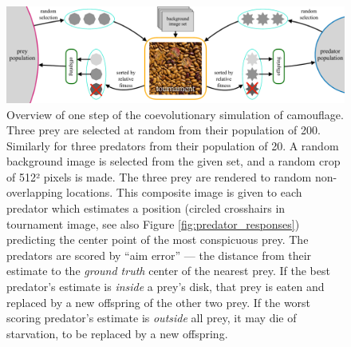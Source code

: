 \documentclass[acmtog]{acmart}
\newcommand{\jargon}[1]{\textit{#1}}
\begin{document}
\begin{figure}
    \includegraphics[width=\textwidth]{coc_overview.pdf}
    \caption{Overview of one step of the coevolutionary simulation of camouflage. Three prey are selected at random from their population of 200. Similarly for three predators from their population of 20. A random background image is selected from the given set, and a random crop of 512² pixels is made. The three prey are rendered to random non-overlapping locations. This composite image is given to each predator which estimates a position (circled crosshairs in tournament image, see also Figure \ref{fig:predator_responses}) predicting the center point of the most conspicuous prey. The predators are scored by “aim error” — the distance from their estimate to the \jargon{ground truth} center of the nearest prey. If the best predator's estimate is \textit{inside} a prey's disk, that prey is eaten and replaced by a new offspring of the other two prey. If the worst scoring predator's estimate is \textit{outside} all prey, it may die of starvation, to be replaced by a new offspring.}
    \label{fig:simulation_overview}
\end{figure}

\end{document}
